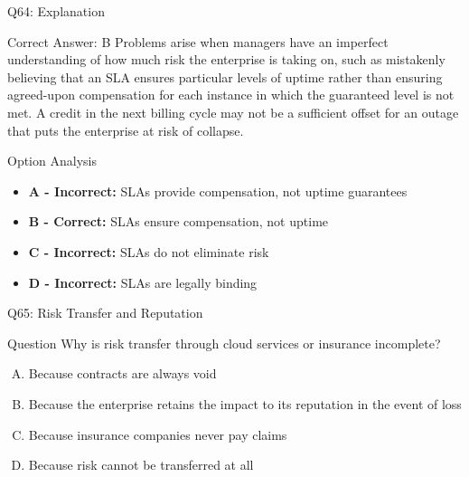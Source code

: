 \documentclass{beamer}
\begin{document}
	\begin{frame}{Q64: Explanation}
		\begin{block}{Correct Answer: B}
			Problems arise when managers have an imperfect understanding of how much risk the enterprise is taking on, such as mistakenly believing that an SLA ensures particular levels of uptime rather than ensuring agreed-upon compensation for each instance in which the guaranteed level is not met. A credit in the next billing cycle may not be a sufficient offset for an outage that puts the enterprise at risk of collapse.
		\end{block}
		\begin{block}{Option Analysis}
			\begin{itemize}
				\item \textbf{A - Incorrect:} SLAs provide compensation, not uptime guarantees
				\item \textbf{B - Correct:} SLAs ensure compensation, not uptime
				\item \textbf{C - Incorrect:} SLAs do not eliminate risk
				\item \textbf{D - Incorrect:} SLAs are legally binding
			\end{itemize}
		\end{block}
	\end{frame}
	
	\begin{frame}{Q65: Risk Transfer and Reputation}
		\begin{block}{Question}
			Why is risk transfer through cloud services or insurance incomplete?
		\end{block}
		\begin{enumerate}[(A)]
			\item Because contracts are always void
			\item Because the enterprise retains the impact to its reputation in the event of loss
			\item Because insurance companies never pay claims
			\item Because risk cannot be transferred at all
		\end{enumerate}
	\end{frame}
	
\end{document}
